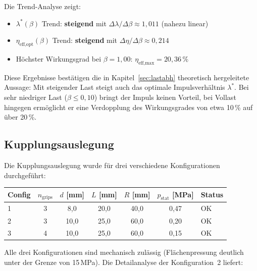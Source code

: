 ﻿\documentclass[a4paper,12pt]{article}
\begin{document}
Die Trend-Analyse zeigt:

\begin{itemize}
  \item $\lambda^*(\beta)$ Trend: \textbf{steigend} mit $\Delta\lambda/\Delta\beta \approx 1{,}011$
    (nahezu linear)
  \item $\eta_\text{eff,opt}(\beta)$ Trend: \textbf{steigend} mit $\Delta\eta/\Delta\beta \approx 0{,}214$
  \item Höchster Wirkungsgrad bei $\beta = 1{,}00$: $\eta_\text{eff,max} = 20{,}36\,\%$
\end{itemize}

Diese Ergebnisse bestätigen die in Kapitel~\ref{sec:lastabh} theoretisch
hergeleitete Aussage: Mit steigender Last steigt auch das optimale Impulsverhältnis
$\lambda^*$. Bei sehr niedriger Last ($\beta \leq 0{,}10$) bringt der Impuls
keinen Vorteil, bei Vollast hingegen ermöglicht er eine Verdopplung des
Wirkungsgrades von etwa 10\,\% auf über 20\,\%.

\subsection{Kupplungsauslegung}

Die Kupplungsauslegung wurde für drei verschiedene Konfigurationen durchgeführt:

\begin{center}
\begin{tabular}{lcccccl}
\toprule
Config & $n_\text{grips}$ & $d$ [mm] & $L$ [mm] & $R$ [mm] & $p_\text{stat}$ [MPa] & Status \\
\midrule
1 & 3 & 8{,}0 & 20{,}0 & 40{,}0 & 0{,}47 & OK \\
2 & 3 & 10{,}0 & 25{,}0 & 60{,}0 & 0{,}20 & OK \\
3 & 4 & 10{,}0 & 25{,}0 & 60{,}0 & 0{,}15 & OK \\
\bottomrule
\end{tabular}
\end{center}

Alle drei Konfigurationen sind mechanisch zulässig (Flächenpressung deutlich
unter der Grenze von 15\,MPa). Die Detailanalyse der Konfiguration~2 liefert:
\end{document}
